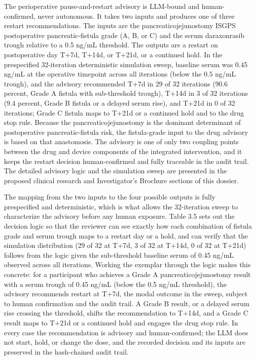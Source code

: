 The perioperative pause-and-restart advisory is LLM-bound and human-confirmed, never
autonomous. It takes two inputs and produces one of three restart recommendations.
The inputs are the pancreaticojejunostomy ISGPS postoperative pancreatic-fistula
grade (A, B, or C) and the serum daraxonrasib trough relative to a 0.5 ng/mL
threshold. The outputs are a restart on postoperative day T+7d, T+14d, or T+21d, or
a continued hold. In the prespecified 32-iteration deterministic simulation sweep,
baseline serum was 0.45 ng/mL at the operative timepoint across all iterations
(below the 0.5 ng/mL trough), and the advisory recommended T+7d in 29 of 32
iterations (90.6 percent, Grade A fistula with sub-threshold trough), T+14d in 3 of
32 iterations (9.4 percent, Grade B fistula or a delayed serum rise), and T+21d in 0
of 32 iterations; Grade C fistula maps to T+21d or a continued hold and to the drug
stop rule. Because the pancreaticojejunostomy is the dominant determinant of
postoperative pancreatic-fistula risk, the fistula-grade input to the drug advisory
is based on that anastomosis. The advisory is one of only two coupling points
between the drug and device components of the integrated intervention, and it keeps
the restart decision human-confirmed and fully traceable in the audit trail. The
detailed advisory logic and the simulation sweep are presented in the proposed
clinical research and Investigator's Brochure sections of this dossier.

The mapping from the two inputs to the four possible outputs is fully prespecified
and deterministic, which is what allows the 32-iteration sweep to characterize the
advisory before any human exposure. Table 3.5 sets out the decision logic so that the
reviewer can see exactly how each combination of fistula grade and serum trough maps
to a restart day or a hold, and can verify that the simulation distribution (29 of 32
at T+7d, 3 of 32 at T+14d, 0 of 32 at T+21d) follows from the logic given the
sub-threshold baseline serum of 0.45 ng/mL observed across all iterations. Working
the exemplar through the logic makes this concrete: for a participant who achieves a
Grade A pancreaticojejunostomy result with a serum trough of 0.45 ng/mL (below the
0.5 ng/mL threshold), the advisory recommends restart at T+7d, the modal outcome in
the sweep, subject to human confirmation and the audit trail. A Grade B result, or a
delayed serum rise crossing the threshold, shifts the recommendation to T+14d, and a
Grade C result maps to T+21d or a continued hold and engages the drug stop rule. In
every case the recommendation is advisory and human-confirmed; the LLM does not
start, hold, or change the dose, and the recorded decision and its inputs are
preserved in the hash-chained audit trail.

